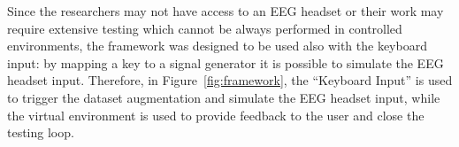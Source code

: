 Since the researchers may not have access to an EEG headset or their work may require extensive testing which cannot be always performed in controlled environments, the framework was designed to be used also with the keyboard input: by mapping a key to a signal generator it is possible to simulate the EEG headset input.
Therefore, in Figure~\ref{fig:framework}, the ``Keyboard Input'' is used to trigger the dataset augmentation and simulate the EEG headset input, while the virtual environment is used to provide feedback to the user and close the testing loop.